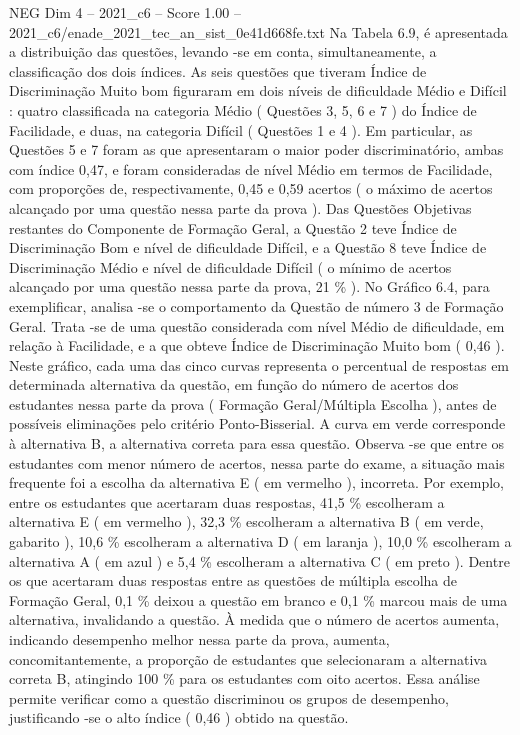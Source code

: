 \begin{textsample}{NEG Dim 4 – 2021\_c6 – Score 1.00 – 2021\_c6/enade\_2021\_tec\_an\_sist\_0e41d668fe.txt}
Na Tabela 6.9, é apresentada a distribuição das questões, levando -se em conta, simultaneamente, a classificação dos dois índices.
As seis questões que tiveram Índice de Discriminação Muito bom figuraram em dois níveis de dificuldade Médio e Difícil : quatro classificada na categoria Médio ( Questões 3, 5, 6 e 7 ) do Índice de Facilidade, e duas, na categoria Difícil ( Questões 1 e 4 ).
Em particular, as Questões 5 e 7 foram as que apresentaram o maior poder discriminatório, ambas com índice 0,47, e foram consideradas de nível Médio em termos de Facilidade, com proporções de, respectivamente, 0,45 e 0,59 acertos ( o máximo de acertos alcançado por uma questão nessa parte da prova ).
Das Questões Objetivas restantes do Componente de Formação Geral, a Questão 2 teve Índice de Discriminação Bom e nível de dificuldade Difícil, e a Questão 8 teve Índice de Discriminação Médio e nível de dificuldade Difícil ( o mínimo de acertos alcançado por uma questão nessa parte da prova, 21 \% ).
No Gráfico 6.4, para exemplificar, analisa -se o comportamento da Questão de número 3 de Formação Geral.
Trata -se de uma questão considerada com nível Médio de dificuldade, em relação à Facilidade, e a que obteve Índice de Discriminação Muito bom ( 0,46 ).
Neste gráfico, cada uma das cinco curvas representa o percentual de respostas em determinada alternativa da questão, em função do número de acertos dos estudantes nessa parte da prova ( Formação Geral/Múltipla Escolha ), antes de possíveis eliminações pelo critério Ponto-Bisserial.
A curva em verde corresponde à alternativa B, a alternativa correta para essa questão.
Observa -se que entre os estudantes com menor número de acertos, nessa parte do exame, a situação mais frequente foi a escolha da alternativa E ( em vermelho ), incorreta.
Por exemplo, entre os estudantes que acertaram duas respostas, 41,5 \% escolheram a alternativa E ( em vermelho ), 32,3 \% escolheram a alternativa B ( em verde, gabarito ), 10,6 \% escolheram a alternativa D ( em laranja ), 10,0 \% escolheram a alternativa A ( em azul ) e 5,4 \% escolheram a alternativa C ( em preto ).
Dentre os que acertaram duas respostas entre as questões de múltipla escolha de Formação Geral, 0,1 \% deixou a questão em branco e 0,1 \% marcou mais de uma alternativa, invalidando a questão.
À medida que o número de acertos aumenta, indicando desempenho melhor nessa parte da prova, aumenta, concomitantemente, a proporção de estudantes que selecionaram a alternativa correta B, atingindo 100 \% para os estudantes com oito acertos.
Essa análise permite verificar como a questão discriminou os grupos de desempenho, justificando -se o alto índice ( 0,46 ) obtido na questão.

\end{textsample}
